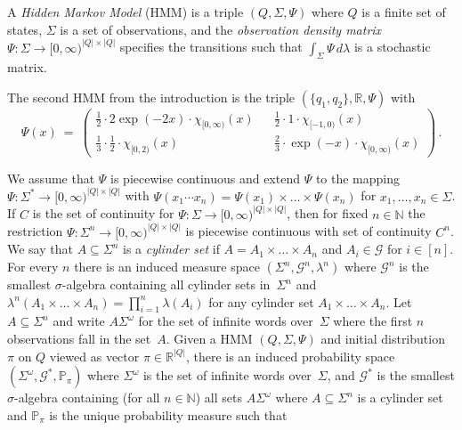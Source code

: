 \documentclass[a4paper,UKenglish,cleveref, autoref,mathscr]{lipics-v2019}
\newcommand{\RR}{\mathbb{R}}
\newcommand{\NN}{\mathbb{N}}
\newcommand{\PP}{\mathbb{P}}
\newcommand{\GG}{\mathscr{G}}
\newcommand{\1}{\mathbbm{1}}
\begin{document}
\begin{definition}\label{HMMdef}
A \emph{Hidden Markov Model} (HMM) is a triple $(Q, \Sigma, \Psi)$ where $Q$ is a finite set of states, $\Sigma$ is a set of observations, and the \emph{observation density matrix} $\Psi : \Sigma \rightarrow [0,\infty)^{|Q| \times |Q|}$ specifies the transitions such that $\int_\Sigma \Psi\, d\lambda$ is a stochastic matrix.
\end{definition}
\begin{example} \label{ex-HMMdef}
The second HMM from the introduction is the triple $(\{q_1, q_2\}, \mathbb{R}, \Psi)$ with
\begin{equation}
\Psi(x) \ = \ \begin{pmatrix}
\frac12 \cdot 2 \exp(-2 x) \cdot \chi_{[0,\infty)}(x) && \frac12 \cdot 1 \cdot \chi_{[-1,0)}(x) \\
\frac13 \cdot \frac12 \cdot \chi_{[0,2)}(x) && \frac23 \cdot \exp(-x) \cdot \chi_{[0,\infty)}(x)
\end{pmatrix}\,. \tag*{\qed}
\end{equation}
\end{example}
We assume that $\Psi$ is piecewise continuous and extend $\Psi$ to the mapping $\Psi : \Sigma^* \rightarrow [0,\infty)^{|Q| \times |Q|}$ with $\Psi(x_1 \cdots x_n) = \Psi(x_1) \times \dots \times \Psi(x_n)$ for $x_1, \dots, x_n \in \Sigma$. If $C$ is the set of continuity for $\Psi : \Sigma \rightarrow [0,\infty)^{|Q| \times |Q|}$, then for fixed $n \in \NN$ the restriction $\Psi : \Sigma^n \rightarrow [0,\infty)^{|Q| \times |Q|}$ is piecewise continuous with set of continuity $C^n$. We say that $A \subseteq \Sigma^n$ is a \emph{cylinder set} if $A = A_1 \times \dots \times A_n$ and $A_i \in \GG$ for $i \in [n]$. For every $n$ there is an induced measure space $(\Sigma^n, \GG^n, \lambda^n)$ where $\GG^n$ is the smallest $\sigma$-algebra containing all cylinder sets in~$\Sigma^n$ and $\lambda^n(A_1 \times \dots \times A_n) = \prod_{i = 1}^n \lambda(A_i)$ for any cylinder set $A_1 \times \dots \times A_n$. Let $A \subseteq \Sigma^n$ and write $A \Sigma^\omega$ for the set of infinite words over~$\Sigma$ where the first $n$ observations fall in the set~$A$. Given a HMM $(Q, \Sigma, \Psi)$ and initial distribution $\pi$ on $Q$ viewed as vector $\pi \in \RR^{|Q|}$, there is an induced probability space $(\Sigma^\omega, \GG^*, \PP_\pi)$ where $\Sigma^\omega$ is the set of infinite words over~$\Sigma$, and $\GG^*$ is the smallest $\sigma$-algebra containing (for all $n \in \NN$) all sets $A \Sigma^\omega$ where $A\subseteq \Sigma^n$ is a cylinder set and $\PP_\pi$ is the unique probability measure such that
\end{document}

